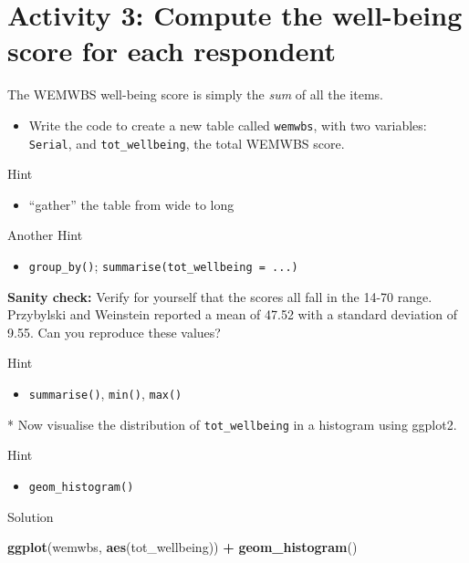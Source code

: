 \documentclass[]{book}
\newenvironment{Shaded}{\begin{snugshade}}{\end{snugshade}}
\newcommand{\KeywordTok}[1]{\textcolor[rgb]{0.13,0.29,0.53}{\textbf{#1}}}
\newcommand{\NormalTok}[1]{#1}
\newcommand{\OperatorTok}[1]{\textcolor[rgb]{0.81,0.36,0.00}{\textbf{#1}}}
\newcommand{\StringTok}[1]{\textcolor[rgb]{0.31,0.60,0.02}{#1}}
\providecommand{\tightlist}{%
  \setlength{\itemsep}{0pt}\setlength{\parskip}{0pt}}
\begin{document}
\hypertarget{activity-3-compute-the-well-being-score-for-each-respondent}{%
\section{Activity 3: Compute the well-being score for each respondent}\label{activity-3-compute-the-well-being-score-for-each-respondent}}

The WEMWBS well-being score is simply the \emph{sum} of all the items.

\begin{itemize}
\tightlist
\item
  Write the code to create a new table called \texttt{wemwbs}, with two variables: \texttt{Serial}, and \texttt{tot\_wellbeing}, the total WEMWBS score.
\end{itemize}

Hint

\begin{itemize}
\tightlist
\item
  ``gather'' the table from wide to long
\end{itemize}

Another Hint

\begin{itemize}
\tightlist
\item
  \texttt{group\_by()}; \texttt{summarise(tot\_wellbeing\ =\ ...)}
\end{itemize}

\textbf{Sanity check:} Verify for yourself that the scores all fall in the 14-70 range. Przybylski and Weinstein reported a mean of 47.52 with a standard deviation of 9.55. Can you reproduce these values?

Hint

\begin{itemize}
\tightlist
\item
  \texttt{summarise()}, \texttt{min()}, \texttt{max()}
\end{itemize}

* Now visualise the distribution of \texttt{tot\_wellbeing} in a histogram using ggplot2.

Hint

\begin{itemize}
\tightlist
\item
  \texttt{geom\_histogram()}
\end{itemize}

Solution

\begin{Shaded}
\begin{Highlighting}[]
\KeywordTok{ggplot}\NormalTok{(wemwbs, }\KeywordTok{aes}\NormalTok{(tot_wellbeing)) }\OperatorTok{+}\StringTok{ }\KeywordTok{geom_histogram}\NormalTok{() }
\end{Highlighting}
\end{Shaded}
\end{document}
